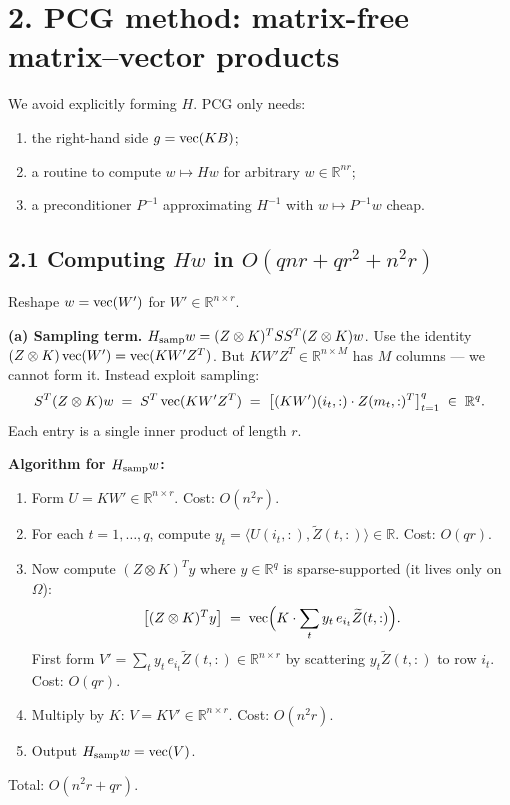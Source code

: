 \section*{2. PCG method: matrix-free matrix--vector products}

We avoid explicitly forming $H$.  PCG only needs:
\begin{enumerate}\setlength\itemsep{2pt}
\item the right-hand side $g=\operatorname{vec}(KB)$;
\item a routine to compute $w\mapsto Hw$ for arbitrary $w\in\mathbb R^{nr}$;
\item a preconditioner $P^{-1}$ approximating $H^{-1}$ with $w\mapsto P^{-1}w$ cheap.
\end{enumerate}

\subsection*{2.1 Computing $H w$ in $O(qnr+qr^2+n^2r)$}

Reshape $w=\operatorname{vec}(W')$ for $W'\in\mathbb R^{n\times r}$.

\textbf{(a) Sampling term.}  $H_{\rm samp} w=(Z\otimes K)^T S S^T(Z\otimes K)w$.  Use the identity $(Z\otimes K)\operatorname{vec}(W')=\operatorname{vec}(KW'Z^T)$.  But $KW'Z^T\in\mathbb R^{n\times M}$ has $M$ columns — we cannot form it.  Instead exploit sampling:
\[
S^T(Z\otimes K)w \;=\; S^T\operatorname{vec}(KW'Z^T) \;=\; \bigl[(KW')(i_t,:)\cdot Z(m_t,:)^T\bigr]_{t=1}^q \;\in\;\mathbb R^q.
\]
Each entry is a single inner product of length $r$.

\textbf{Algorithm for $H_{\rm samp} w$:}
\begin{enumerate}\setlength\itemsep{2pt}
\item Form $U=KW'\in\mathbb R^{n\times r}$. \quad Cost: $O(n^2 r)$.
\item For each $t=1,\ldots,q$, compute $y_t=\langle U(i_t,:),\widetilde Z(t,:)\rangle\in\mathbb R$. \quad Cost: $O(qr)$.
\item Now compute $(Z\otimes K)^T y$ where $y\in\mathbb R^q$ is sparse-supported (it lives only on $\Omega$):
\[
\bigl[(Z\otimes K)^T y\bigr] \;=\; \operatorname{vec}\Bigl(K\cdot\sum_{t}y_t\,e_{i_t}\widetilde Z(t,:)\Bigr).
\]
First form $V'=\sum_t y_t\,e_{i_t}\widetilde Z(t,:)\in\mathbb R^{n\times r}$ by scattering $y_t\widetilde Z(t,:)$ to row $i_t$.  Cost: $O(qr)$.
\item Multiply by $K$: $V=KV'\in\mathbb R^{n\times r}$.  Cost: $O(n^2r)$.
\item Output $H_{\rm samp}w=\operatorname{vec}(V)$.
\end{enumerate}
Total: $O(n^2r + qr)$.

